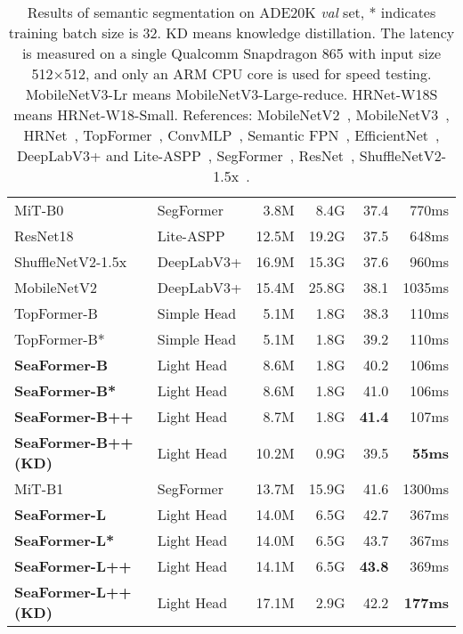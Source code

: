 \begin{table*}
\begin{tabular}{L{3.6cm} L{1.9cm}| r |r| r |r}
\hline
\hline
MiT-B0 &  SegFormer &  3.8M & 8.4G & 37.4 & 770ms \\
ResNet18 &  Lite-ASPP  &  12.5M & 19.2G & 37.5 & 648ms \\
ShuffleNetV2-1.5x &  DeepLabV3+ & 16.9M & 15.3G & 37.6 & 960ms\\
MobileNetV2 & DeepLabV3+ & 15.4M  & 25.8G & 38.1 & 1035ms \\
TopFormer-B  &  Simple Head &  5.1M & 1.8G  & 38.3   & 110ms   \\
TopFormer-B*  &  Simple Head &  5.1M & 1.8G  & 39.2   & 110ms   \\
\textbf{SeaFormer-B}  &  Light Head &  8.6M & 1.8G  & 40.2      & 106ms\\
\textbf{SeaFormer-B*}  &  Light Head &  8.6M & 1.8G  & 41.0     & 106ms\\
\textbf{SeaFormer-B++}  &  Light Head &  8.7M & 1.8G  & \textbf{41.4}      & 107ms\\
\textbf{SeaFormer-B++(KD)}  &  Light Head &  10.2M    & 0.9G  & 39.5 & \textbf{55ms}\\
\hline

\hline
\hline
MiT-B1  &  SegFormer &  13.7M & 15.9G  & 41.6   & 1300ms   \\
\textbf{SeaFormer-L}  &  Light Head &  14.0M & 6.5G  & 42.7      & 367ms\\
\textbf{SeaFormer-L*}  &  Light Head &  14.0M & 6.5G  & 43.7      & 367ms\\
\textbf{SeaFormer-L++}  &  Light Head &  14.1M & 6.5G  & \textbf{43.8}      & 369ms\\
\textbf{SeaFormer-L++(KD)}  &  Light Head &  17.1M    & 2.9G  & 42.2 & \textbf{177ms}\\
\hline

\hline

\hline
\end{tabular}
\caption{Results of semantic segmentation on ADE20K \textit{val} set, * indicates training batch size is 32. KD means knowledge distillation.
The latency is measured on a single Qualcomm Snapdragon 865 with input size 512×512, and only an ARM CPU core is used for speed testing. MobileNetV3-Lr means MobileNetV3-Large-reduce. HRNet-W18S means HRNet-W18-Small.
References:
MobileNetV2~\cite{sandler2018mobilenetv2}, 
MobileNetV3~\cite{howard2019searching},
HRNet~\cite{yuan2020object},
TopFormer~\cite{zhang2022topformer},
ConvMLP~\cite{li2021convmlp},
Semantic FPN~\cite{kirillov2019panoptic},
EfficientNet~\cite{tan2019efficientnet},
DeepLabV3+ and Lite-ASPP~\cite{chen2018encoder},
SegFormer~\cite{xie2021segformer},
ResNet~\cite{he2016deep},
ShuffleNetV2-1.5x~\cite{ma2018shufflenet}.
}
\label{ade20k_table}
\end{table*}
